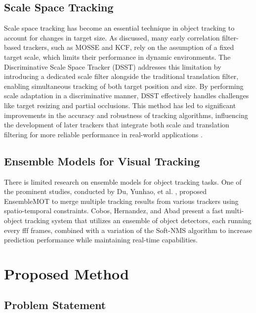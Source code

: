 \documentclass[11pt, letterpaper]{article}
\begin{document}
\subsection{Scale Space Tracking}

Scale space tracking has become an essential technique in object tracking to account for changes in target size. As discussed, many early correlation filter-based trackers, such as MOSSE and KCF, rely on the assumption of a fixed target scale, which limits their performance in dynamic environments. The Discriminative Scale Space Tracker (DSST) addresses this limitation by introducing a dedicated scale filter alongside the traditional translation filter, enabling simultaneous tracking of both target position and size. By performing scale adaptation in a discriminative manner, DSST effectively handles challenges like target resizing and partial occlusions. This method has led to significant improvements in the accuracy and robustness of tracking algorithms, influencing the development of later trackers that integrate both scale and translation filtering for more reliable performance in real-world applications \cite{danelljan_discriminative_2017}.

\subsection{Ensemble Models for Visual Tracking}

There is limited research on ensemble models for object tracking tasks. One of the prominent studies, conducted by Du, Yunhao, et al. \cite{du_ensemblemot_2023}, proposed EnsembleMOT to merge multiple tracking results from various trackers using spatio-temporal constraints. Cobos, Hernandez, and Abad \cite{cobos_fast_2019} present a fast multi-object tracking system that utilizes an ensemble of object detectors, each running every fff frames, combined with a variation of the Soft-NMS algorithm to increase prediction performance while maintaining real-time capabilities.

\section{Proposed Method}

\subsection{Problem Statement}
\end{document}
